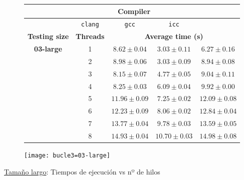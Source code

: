 \begin{figure}[H]
    \centering
    \begin{subfigure}{0.4\textwidth}
        \begin{adjustbox}{width=\textwidth} 
        \begin{tabular}{|c|c|c|c|c|}
            \hline
            \rowcolor{azul} \multicolumn{2}{|c|}{}&\multicolumn{3}{c|}{\textbf{Compiler}} \\ \hline
            \rowcolor{azul} \multicolumn{2}{|c|}{}&\texttt{clang}&\texttt{gcc}&\texttt{icc}\\ \hline
            \rowcolor{azul} \textbf{Testing size} & \textbf{Threads}&\multicolumn{3}{c|}{\textbf{Average time (s)}} \\ \hline
            \multirow{8}{1cm}{\textbf{03-large}} & 1 & \(8.62\pm{0.04}\) & \(3.03\pm{0.11}\) & \(6.27\pm{0.16}\) \\ \cline{2-5}
            & 2 & \(8.98\pm{0.06}\) & \(3.03\pm{0.09}\) & \(8.94\pm{0.08}\) \\ \cline{2-5}
            & 3 & \(8.15\pm{0.07}\) & \(4.77\pm{0.05}\) & \(9.04\pm{0.11}\) \\ \cline{2-5}
            & 4 & \(8.25\pm{0.03}\) & \(6.09\pm{0.04}\) & \(9.92\pm{0.00}\) \\ \cline{2-5}
            & 5 & \(11.96\pm{0.09}\) & \(7.25\pm{0.02}\) & \(12.09\pm{0.08}\) \\ \cline{2-5}
            & 6 & \(12.23\pm{0.09}\) & \(8.06\pm{0.02}\) & \(12.84\pm{0.04}\) \\ \cline{2-5}
            & 7 & \(13.77\pm{0.04}\) & \(9.78\pm{0.03}\) & \(13.59\pm{0.05}\) \\ \cline{2-5}
            & 8 & \(14.93\pm{0.04}\) & \(10.70\pm{0.03}\) & \(14.98\pm{0.08}\) \\ \hline
        \end{tabular}
        \end{adjustbox}
    \end{subfigure}
    \hfill
    \begin{subfigure}{0.5\textwidth}
        \texttt{[image: bucle3=03-large]}
    \end{subfigure}
    \caption{\underline{Tamaño largo}: Tiempos de ejecución vs nº de hilos}
    \label{bucle3=03-large}
\end{figure}
